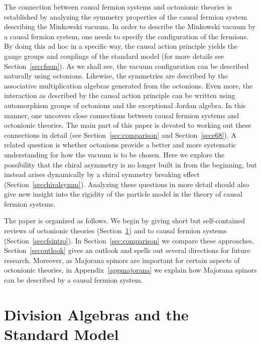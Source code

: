 \documentclass[reqno,11pt]{amsart}
\numberwithin{equation}{section}
\newcommand{\1}{\mbox{\rm 1 \hspace{-1.05 em} 1}}
\begin{document}
The connection between causal fermion systems and octonionic theories is established
by analyzing the symmetry properties of the causal fermion system describing the Minkowski vacuum.
In order to describe the Minkowski vacuum by a causal fermion system, one needs to specify the
configuration of the fermions. By doing this ad hoc in a specific way, 
the causal action principle yields the gauge groups and couplings of the standard model
(for more details see Section~\ref{seccfssm}).
As we shall see, the vacuum configuration can be described naturally using octonions.
Likewise, the symmetries are described by the associative multiplication algebras generated from the octonions.
Even more, the interaction as described by the causal action principle can be written
using automorphism groups of octonions and the exceptional Jordan algebra.
In this manner, one uncovers close connections between causal fermion systems and octonionic theories.
The main part of this paper is devoted to working out these connections in detail
(see Section~\ref{sec:comparison} and Section~\ref{sece68}).
A related question is whether octonions provide a better and more systematic understanding for
how the vacuum is to be chosen. Here we explore the possibility that the chiral asymmetry is no
longer built in from the beginning, but instead arises dynamically by a chiral symmetry breaking effect
(Section~\ref{secchiralsymm}). Analyzing these questions in more detail should also give new insight into
the rigidity of the particle model in the theory of causal fermion systems.

The paper is organized as follows. We begin by giving short but self-contained reviews
of octonionic theories (Section~\ref{secintroocto}) and to causal fermion systems (Section~\ref{seccfsintro}).
In Section~\ref{sec:comparison} we compare these approaches.
Section~\ref{secoutlook} gives an outlook and spells out several directions for future research.
Moreover, as Majorana spinors are important for certain aspects of octonionic theories,
in Appendix~\ref{appmajorana} we explain how Majorana spinors can be described by a causal fermion system.


\section{Division Algebras and the Standard Model} \label{secintroocto}
\end{document}
